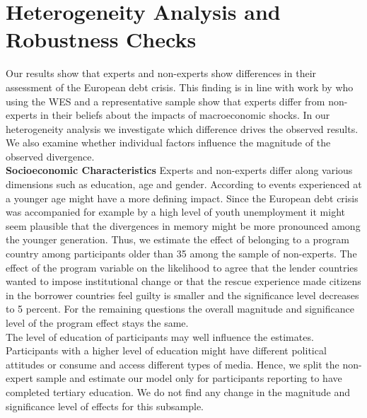 \section{Heterogeneity Analysis and Robustness Checks}
Our results show that experts and non-experts show differences in their assessment of the European debt crisis. This finding is in line with work by \cite{roth} who using the WES and a representative sample show that experts differ from non-experts in their beliefs about the impacts of macroeconomic shocks. In our heterogeneity analysis we investigate which difference drives the observed results. We also examine whether individual factors influence the magnitude of the observed divergence. 
\\



\textbf{Socioeconomic Characteristics}
 Experts and non-experts differ along various dimensions such as education, age and gender.
 According to \cite{baumeister} events experienced at a younger age might have a more defining impact. Since the European debt crisis was accompanied for example by a high level of youth unemployment it might seem plausible that the divergences in memory might be more pronounced among the younger generation. Thus, we estimate the effect of belonging to a program country among participants older than 35 among the sample of non-experts.  The effect of the program variable on the likelihood to agree that the lender countries wanted to impose institutional change or that the rescue experience made citizens in the borrower countries feel guilty is smaller and the significance level decreases to 5 percent. For the remaining questions the overall magnitude and significance level of the program effect stays the same. 
\\
The level of education of participants may well influence the estimates. Participants with a higher level of education might have different political attitudes or consume and access different types of media. Hence, we split the non-expert sample and estimate our model only for participants reporting to have completed tertiary education. We do not find any change in the magnitude and significance level of effects for this subsample. 
\\
